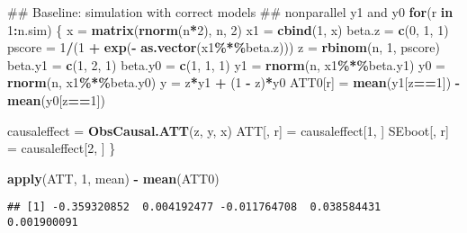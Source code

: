 \documentclass[]{article}
\newenvironment{Shaded}{\begin{snugshade}}{\end{snugshade}}
\newcommand{\KeywordTok}[1]{\textcolor[rgb]{0.13,0.29,0.53}{\textbf{#1}}}
\newcommand{\DecValTok}[1]{\textcolor[rgb]{0.00,0.00,0.81}{#1}}
\newcommand{\StringTok}[1]{\textcolor[rgb]{0.31,0.60,0.02}{#1}}
\newcommand{\ControlFlowTok}[1]{\textcolor[rgb]{0.13,0.29,0.53}{\textbf{#1}}}
\newcommand{\OperatorTok}[1]{\textcolor[rgb]{0.81,0.36,0.00}{\textbf{#1}}}
\newcommand{\NormalTok}[1]{#1}
\begin{document}
\begin{Shaded}
\begin{Highlighting}[]
\NormalTok{## Baseline: simulation with correct models}
\NormalTok{## nonparallel y1 and y0}
\ControlFlowTok{for}\NormalTok{(r }\ControlFlowTok{in} \DecValTok{1}\OperatorTok{:}\NormalTok{n.sim)}
\NormalTok{\{}
\NormalTok{  x       =}\StringTok{ }\KeywordTok{matrix}\NormalTok{(}\KeywordTok{rnorm}\NormalTok{(n}\OperatorTok{*}\DecValTok{2}\NormalTok{), n, }\DecValTok{2}\NormalTok{)}
\NormalTok{  x1      =}\StringTok{ }\KeywordTok{cbind}\NormalTok{(}\DecValTok{1}\NormalTok{, x)}
\NormalTok{  beta.z  =}\StringTok{ }\KeywordTok{c}\NormalTok{(}\DecValTok{0}\NormalTok{, }\DecValTok{1}\NormalTok{, }\DecValTok{1}\NormalTok{)}
\NormalTok{  pscore  =}\StringTok{ }\DecValTok{1}\OperatorTok{/}\NormalTok{(}\DecValTok{1} \OperatorTok{+}\StringTok{ }\KeywordTok{exp}\NormalTok{(}\OperatorTok{-}\StringTok{ }\KeywordTok{as.vector}\NormalTok{(x1}\OperatorTok{\%*\%}\NormalTok{beta.z)))}
\NormalTok{  z       =}\StringTok{ }\KeywordTok{rbinom}\NormalTok{(n, }\DecValTok{1}\NormalTok{, pscore)}
\NormalTok{  beta.y1 =}\StringTok{ }\KeywordTok{c}\NormalTok{(}\DecValTok{1}\NormalTok{, }\DecValTok{2}\NormalTok{, }\DecValTok{1}\NormalTok{)}
\NormalTok{  beta.y0 =}\StringTok{ }\KeywordTok{c}\NormalTok{(}\DecValTok{1}\NormalTok{, }\DecValTok{1}\NormalTok{, }\DecValTok{1}\NormalTok{)}
\NormalTok{  y1      =}\StringTok{ }\KeywordTok{rnorm}\NormalTok{(n, x1}\OperatorTok{\%*\%}\NormalTok{beta.y1)}
\NormalTok{  y0      =}\StringTok{ }\KeywordTok{rnorm}\NormalTok{(n, x1}\OperatorTok{\%*\%}\NormalTok{beta.y0)}
\NormalTok{  y       =}\StringTok{ }\NormalTok{z}\OperatorTok{*}\NormalTok{y1 }\OperatorTok{+}\StringTok{ }\NormalTok{(}\DecValTok{1} \OperatorTok{-}\StringTok{ }\NormalTok{z)}\OperatorTok{*}\NormalTok{y0}
\NormalTok{  ATT0[r] =}\StringTok{ }\KeywordTok{mean}\NormalTok{(y1[z}\OperatorTok{==}\DecValTok{1}\NormalTok{]) }\OperatorTok{-}\StringTok{ }\KeywordTok{mean}\NormalTok{(y0[z}\OperatorTok{==}\DecValTok{1}\NormalTok{])}
  
\NormalTok{  causaleffect =}\StringTok{ }\KeywordTok{ObsCausal.ATT}\NormalTok{(z, y, x)}
\NormalTok{  ATT[, r]     =}\StringTok{ }\NormalTok{causaleffect[}\DecValTok{1}\NormalTok{, ]}
\NormalTok{  SEboot[, r]  =}\StringTok{ }\NormalTok{causaleffect[}\DecValTok{2}\NormalTok{, ]}
\NormalTok{\}}

\KeywordTok{apply}\NormalTok{(ATT, }\DecValTok{1}\NormalTok{, mean) }\OperatorTok{-}\StringTok{ }\KeywordTok{mean}\NormalTok{(ATT0)}
\end{Highlighting}
\end{Shaded}

\begin{verbatim}
## [1] -0.359320852  0.004192477 -0.011764708  0.038584431  0.001900091
\end{verbatim}
\end{document}
